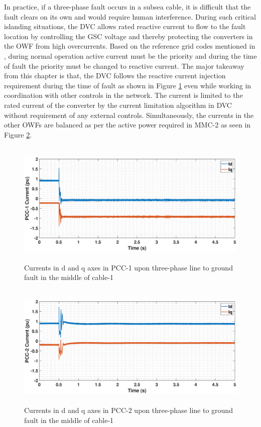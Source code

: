 In practice, if a three-phase fault occurs in a subsea cable, it is difficult that the fault clears on its own and would require human interference. During such critical islanding situations, the \gls{DVC} allows rated reactive current to flow to the fault location by controlling the \gls{GSC} voltage and thereby protecting the converters in the \gls{OWF} from high overcurrents. Based on the reference grid codes mentioned in \cite{mohseni_review_2012}, during normal operation active current must be the priority and during the time of fault the priority must be changed to reactive current. The major takeaway from this chapter is that, the \gls{DVC} follows the reactive current injection requirement during the time of fault as shown in Figure \ref{IDQ_WT1_3phaseSC} even while working in coordination with other controls in the network. The current is limited to the rated current of the converter by the current limitation algorithm in \gls{DVC} without requirement of any external controls. Simultaneously, the currents in the other \gls{OWF}s are balanced as per the active power required in \gls{MMC}-2 as seen in Figure \ref{IDQ_WT2_3phaseSC}. 

\vspace{-3mm}
\begin{figure}[H]
    \includegraphics[height = 6cm,width = \textwidth]{Diagrams/Chapter_5/IDQ_WT1_3phaseSC.eps}
    \caption{Currents in d and q axes in PCC-1 upon three-phase line to ground fault in the middle of cable-1}
    \label{IDQ_WT1_3phaseSC}
\end{figure}
\vspace{-5mm}
\begin{figure}[H]
    \includegraphics[height = 6cm,width = \textwidth]{Diagrams/Chapter_5/IDQ_WT2_3phaseSC.eps}
    \caption{Currents in d and q axes in PCC-2 upon three-phase line to ground fault in the middle of cable-1}
    \label{IDQ_WT2_3phaseSC}
\end{figure}